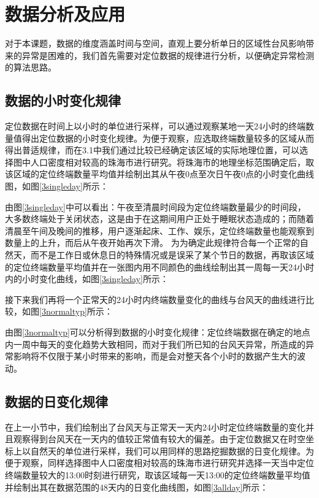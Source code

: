 \documentclass[a4paper,AutoFakeBold,oneside,12pt]{book}
\begin{document}
{{\section{数据分析及应用}
	对于本课题，数据的维度涵盖时间与空间，直观上要分析单日的区域性台风影响带来的异常是困难的，我们首先需要对定位数据的规律进行分析，以便确定异常检测的算法思路。
\subsection{数据的小时变化规律}
	定位数据在时间上以小时的单位进行采样，可以通过观察某地一天24小时的终端数量值得出定位数据的小时变化规律。为便于观察，应选取终端数量较多的区域从而得出普适规律，而在3.1中我们通过比较已经确定该区域的实际地理位置，可以选择图中人口密度相对较高的珠海市进行研究。将珠海市的地理坐标范围确定后，取该区域的定位终端数量平均值并绘制出其从午夜0点至次日午夜0点的小时变化曲线图，如图\ref{3singleday}所示：


	由图\ref{3singleday}中可以看出：午夜至清晨时间段为定位终端数量最少的时间段，大多数终端处于关闭状态，这是由于在这期间用户正处于睡眠状态造成的；而随着清晨至午间及晚间的推移，用户逐渐起床、工作、娱乐，定位终端数量也能观察到数量上的上升，而后从午夜开始再次下滑。
	为为确定此规律符合每一个正常的自然天，而不是工作日或休息日的特殊情况或是误采了某个节日的数据，再取该区域的定位终端数量平均值并在一张图内用不同颜色的曲线绘制出其一周每一天24小时内的小时变化曲线，如图\ref{3singleday}所示：


	接下来我们再将一个正常天的24小时内终端数量变化的曲线与台风天的曲线进行比较，如图\ref{3normaltyp}所示：


	由图\ref{3normaltyp}可以分析得到数据的小时变化规律：定位终端数据在确定的地点内一周中每天的变化趋势大致相同，而对于我们所已知的台风天异常，所造成的异常影响将不仅限于某小时带来的影响，而是会对整天各个小时的数据产生大的波动。

\subsection{数据的日变化规律}
	在上一小节中，我们绘制出了台风天与正常天一天内24小时定位终端数量的变化并且观察得到台风天在一天内的值较正常值有较大的偏差。由于定位数据又在时空坐标上以自然天的单位进行采样，我们可以用同样的思路挖掘数据的日变化规律。为便于观察，同样选择图中人口密度相对较高的珠海市进行研究并选择一天当中定位终端数量较大的13:00时刻进行研究，取该区域每一天13:00的定位终端数量平均值并绘制出其在数据范围的48天内的日变化曲线图，如图\ref{3allday}所示：

}}
\end{document}

